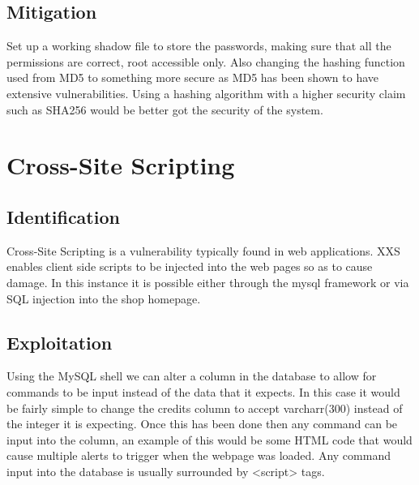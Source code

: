 \documentclass[paper=a4, fontsize=11pt]{scrartcl}
\numberwithin{equation}{section}		%
\numberwithin{figure}{section}			%
\numberwithin{table}{section}				%
\begin{document}
\subsection*{Mitigation}


Set up a working shadow file to store the passwords, making sure that all the permissions are correct, root accessible only. Also changing the hashing function used from MD5 to something more secure as MD5 has been shown to have extensive vulnerabilities. Using a hashing algorithm with a higher security claim such as SHA256 would be better got the security of the system.

\section*{Cross-Site Scripting}
\subsection*{Identification}


Cross-Site Scripting is a vulnerability typically found in web applications. XXS enables client side scripts to be injected into the web pages so as to cause damage. In this instance it is possible either through the mysql framework or via SQL injection into the shop homepage. 

\subsection*{Exploitation}


Using the MySQL shell we can alter a column in the database to allow for commands to be input instead of the data that it expects. In this case it would be fairly simple to change the credits column to accept varcharr(300) instead of the integer it is expecting. Once this has been done then any command can be input into the column, an example of this would be some HTML code that would cause multiple alerts to trigger when the webpage was loaded. Any command input into the database is usually surrounded by <script> tags.
\end{document}
